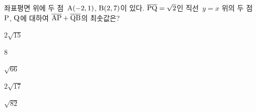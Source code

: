 좌표평면 위에 두 점~$\mathrm{A}(-2{,}\mkern3mu 1)$, $\mathrm{B}(2{,}\mkern3mu 7)$이 있다. $\overline{\mathrm{PQ}}=\sqrt{2}$인 직선~$y=x$ 위의 두 점~$\mathrm{P}$, $\mathrm{Q}$에 대하여 $\overline{\mathrm{AP}}+\overline{\mathrm{QB}}$의 최솟값은? 
\begin{choices32}{\rule[-3ex]{0pt}{8ex}$2\sqrt{15}$}{\rule[-3ex]{0pt}{8ex}$8$}{\rule[-3ex]{0pt}{8ex}$\sqrt{66}$}{\rule[-3ex]{0pt}{8ex}$2\sqrt{17}$}{\rule[-3ex]{0pt}{8ex}$\sqrt{82}$}\end{choices32}
